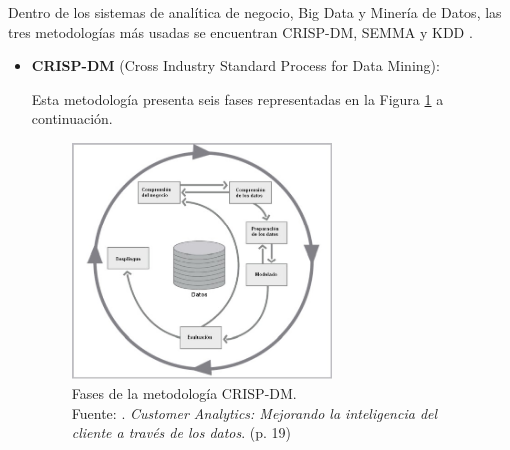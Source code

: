 Dentro de los sistemas de analítica de negocio, Big Data y Minería de Datos, las tres metodologías más usadas se encuentran CRISP-DM, SEMMA y KDD \parencite{tec_braulio2015metodologiasdm}.
\begin{itemize}
	\item \textbf{CRISP-DM} (Cross Industry Standard Process for Data Mining):
	
	Esta metodología presenta seis fases representadas en la Figura \ref{2:fig9} a continuación.
	\begin{figure}[h]
		\begin{center}
			\includegraphics[width=0.65\textwidth]{2/figures/crispdm.jpg}
			\caption[Fases de la metodología CRISP-DM]{Fases de la metodología CRISP-DM.\\
			Fuente: \cite{tec_braulio2015metodologiasdm}. \textit{Customer Analytics: Mejorando la inteligencia del cliente a través de los datos}. (p. 19)}
			\label{2:fig9}
		\end{center}
	\end{figure}
		

\end{itemize}
